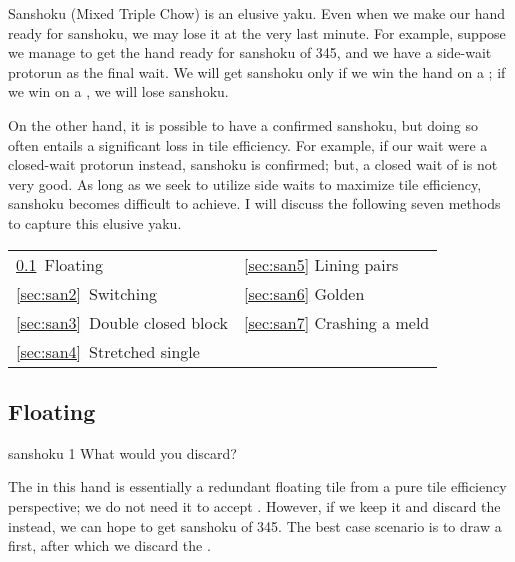{\jap Sanshoku} (Mixed Triple Chow) is an elusive {\jap yaku}. 
Even when we make our hand ready for {\jap sanshoku}, we may lose it at the very last minute. For example, suppose we manage to get the hand ready for {\jap sanshoku} of 345, and we have a side-wait protorun {\large{}} as the final wait. We will get {\jap sanshoku} only if we win the hand on a {\large{}}; if we win on a {\large{}}, we will lose {\jap sanshoku}.

\bigskip
On the other hand, it is possible to have a confirmed {\jap sanshoku}, but doing so often entails a significant loss in tile efficiency. For example, if our wait were a closed-wait protorun {\large{}} instead, {\jap sanshoku} is confirmed; but, a closed wait of {\large{}} is not very good. As long as we seek to utilize side waits to maximize tile efficiency, {\jap sanshoku} becomes difficult to achieve. I will discuss the following seven methods to capture this elusive {\jap yaku}. 

\bigskip
\begin{tabular}{l l}
\ref{sec:san1}~Floating & \ref{sec:san5} Lining pairs\\
\ref{sec:san2}~Switching &\ref{sec:san6} Golden\\
\ref{sec:san3}~Double closed block & \ref{sec:san7} Crashing a meld\\
\ref{sec:san4}~Stretched single\\
\end{tabular}

\newpage

\subsection{Floating}\label{sec:san1}

\begin{itembox}[r]{{\jap sanshoku} 1}
\bp
{}\bei
\ep
\vspace{-10pt} What would you discard? \vspace{-5pt}
\end{itembox}
\noindent
The {\large{}} in this hand is essentially a redundant floating tile from a pure tile efficiency perspective; we do not need it to accept {\large{}}. However, if we keep it and discard the {\large\bei} instead, we can hope to get {\jap sanshoku} of 345. The best case scenario is to draw a {\large{}} first, after which we discard the {\large{}}. 

